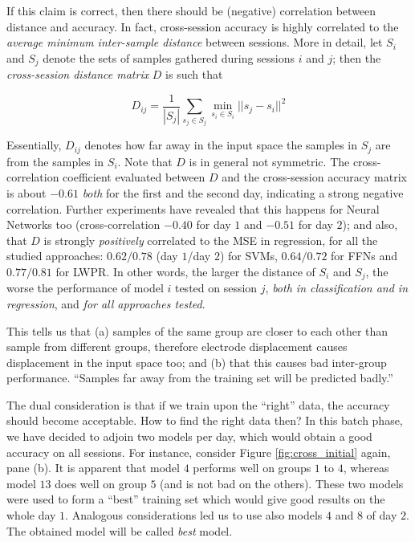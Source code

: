 If this claim is correct, then there should be (negative) correlation
between distance and accuracy. In fact, cross-session accuracy is
highly correlated to the \emph{average minimum inter-sample distance}
between sessions. More in detail, let $S_i$ and $S_j$ denote the sets
of samples gathered during sessions $i$ and $j$; then the
\emph{cross-session distance matrix} $D$ is such that

$$ D_{ij} = \frac{1}{|S_j|} \sum_{s_j \in S_j}{\min_{s_i \in S_i}{ ||s_j-s_i||^2 } } $$

Essentially, $D_{ij}$ denotes how far away in the input space the
samples in $S_j$ are from the samples in $S_i$. Note that $D$ is in
general not symmetric. The cross-correlation coefficient evaluated
between $D$ and the cross-session accuracy matrix is about $-0.61$
\emph{both} for the first and the second day, indicating a strong
negative correlation. Further experiments have revealed that this
happens for Neural Networks too (cross-correlation $-0.40$ for day $1$
and $-0.51$ for day $2$); and also, that $D$ is strongly
\emph{positively} correlated to the MSE in regression, for all the
studied approaches: $0.62/0.78$ (day $1$/day $2$) for SVMs,
$0.64/0.72$ for FFNs and $0.77/0.81$ for LWPR. In other words, the
larger the distance of $S_i$ and $S_j$, the worse the performance of
model $i$ tested on session $j$, \emph{both in classification and in
regression}, and \emph{for all approaches tested}.

This tells us that (a) samples of the same group are closer to each
other than sample from different groups, therefore electrode
displacement causes displacement in the input space too; and (b) that
this causes bad inter-group performance. ``Samples far away from the
training set will be predicted badly.''

The dual consideration is that if we train upon the ``right'' data,
the accuracy should become acceptable. How to find the right data
then? In this batch phase, we have decided to adjoin two models per
day, which would obtain a good accuracy on all sessions. For instance,
consider Figure \ref{fig:cross_initial} again, pane (b). It is
apparent that model $4$ performs well on groups $1$ to $4$, whereas
model $13$ does well on group $5$ (and is not bad on the
others). These two models were used to form a ``best'' training set
which would give good results on the whole day $1$. Analogous
considerations led us to use also models $4$ and $8$ of day $2$. The
obtained model will be called \emph{best} model.

